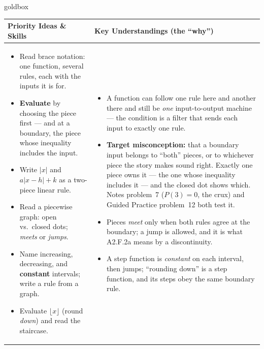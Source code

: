 \documentclass[10pt]{article}
\begin{document}
\renewcommand{\arraystretch}{1.4}
\boxguard
\begin{skillbox}{goldbox}
\begin{tabularx}{\linewidth}{@{}X|X@{}}
\textbf{Priority Ideas \& Skills} & \textbf{Key Understandings (the ``why'')} \\[2pt]
\hline
\vspace{-6pt}
\begin{itemize}[leftmargin=1.1em, nosep, after=\vspace{2pt}]
  \item Read brace notation: one function, several rules, each with the inputs it is for.
  \item \textbf{Evaluate} by choosing the piece first --- and at a boundary, the piece whose
        inequality includes the input.
  \item Write $|x|$ and $a|x-h|+k$ as a two-piece linear rule.
  \item Read a piecewise graph: open vs.\ closed dots; \emph{meets} or \emph{jumps}.
  \item Name increasing, decreasing, and \textbf{constant} intervals; write a rule from a graph.
  \item Evaluate $\lfloor x\rfloor$ (round \emph{down}) and read the staircase.
\end{itemize}
&
\vspace{-6pt}
\begin{itemize}[leftmargin=1.1em, nosep, after=\vspace{2pt}]
  \item A function can follow one rule here and another there and still be \emph{one}
        input-to-output machine --- the condition is a filter that sends each input to exactly
        one rule.
  \item \textbf{Target misconception:} that a boundary input belongs to ``both'' pieces, or to
        whichever piece the story makes sound right. Exactly one piece owns it --- the one whose
        inequality includes it --- and the closed dot shows which. Notes problem~7 ($P(3)=0$, the
        crux) and Guided Practice problem~12 both test it.
  \item Pieces \emph{meet} only when both rules agree at the boundary; a jump is allowed, and it
        is what A2.F.2a means by a discontinuity.
  \item A step function is \emph{constant} on each interval, then jumps; ``rounding down'' is a
        step function, and its steps obey the same boundary rule.
\end{itemize}
\end{tabularx}
\end{skillbox}
\end{document}
